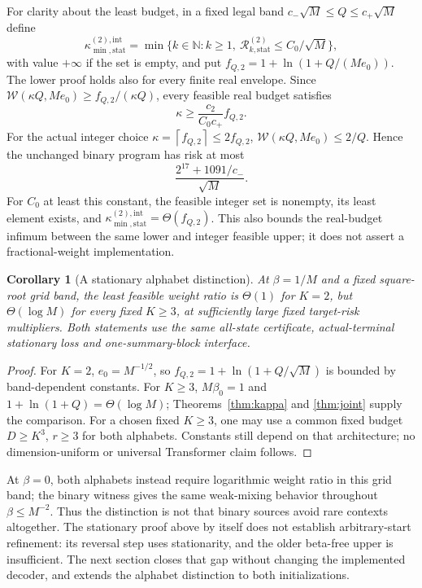 \documentclass[11pt,letterpaper]{article}
\newtheorem{corollary}[theorem]{Corollary}
\theoremstyle{definition}\newtheorem{definition}[theorem]{Definition}
\theoremstyle{remark}\newtheorem{remark}[theorem]{Remark}
\newcommand{\ceil}[1]{\left\lceil #1\right\rceil}
\newcommand{\betaz}{\beta_0}
\newcommand{\Risk}{\mathcal{R}}
\begin{document}
For clarity about the least budget, in a fixed legal band
$c_-\sqrt M\le Q\le c_+\sqrt M$ define
\[
 \kappa_{\min,\mathrm{stat}}^{(2),\mathrm{int}}
 =\min\{k\in\mathbb N:k\ge1,\
       \Risk_{k,\mathrm{stat}}^{(2)}\le C_0/\sqrt M\},
\]
with value $+\infty$ if the set is empty, and put
$f_{Q,2}=1+\ln(1+Q/(Me_0))$.
The lower proof holds also for every finite real envelope. Since
$\mathcal W(\kappa Q,Me_0)\ge f_{Q,2}/(\kappa Q)$, every feasible real budget satisfies
\[
 \kappa\ge\frac{c_2}{C_0c_+}f_{Q,2}.
\]
For the actual integer choice $\kappa=\ceil{f_{Q,2}}\le2f_{Q,2}$,
$\mathcal W(\kappa Q,Me_0)\le2/Q$. Hence the unchanged binary program has risk at most
\[
 \frac{2^{17}+1091/c_-}{\sqrt M}.
\]
For $C_0$ at least this constant, the feasible integer set is nonempty, its least element exists, and
$\kappa_{\min,\mathrm{stat}}^{(2),\mathrm{int}}=\Theta(f_{Q,2})$.
This also bounds the real-budget infimum between the same lower and integer feasible upper; it does not assert a fractional-weight implementation.

\begin{corollary}[A stationary alphabet distinction]\label{cor:alphabet}
At $\beta=1/M$ and a fixed square-root grid band, the least feasible weight ratio is $\Theta(1)$ for $K=2$, but $\Theta(\log M)$ for every fixed $K\ge3$, at sufficiently large fixed target-risk multipliers. Both statements use the same all-state certificate, actual-terminal stationary loss and one-summary-block interface.
\end{corollary}
\begin{proof}
For $K=2$, $e_0=M^{-1/2}$, so $f_{Q,2}=1+\ln(1+Q/\sqrt M)$ is bounded by band-dependent constants. For $K\ge3$, $M\betaz=1$ and $1+\ln(1+Q)=\Theta(\log M)$; Theorems~\ref{thm:kappa} and \ref{thm:joint} supply the comparison. For a chosen fixed $K\ge3$, one may use a common fixed budget $D\ge K^3$, $r\ge3$ for both alphabets. Constants still depend on that architecture; no dimension-uniform or universal Transformer claim follows.
\end{proof}

At $\beta=0$, both alphabets instead require logarithmic weight ratio in this grid band; the binary witness gives the same weak-mixing behavior throughout $\beta\le M^{-2}$. Thus the distinction is not that binary sources avoid rare contexts altogether. The stationary proof above by itself does not establish arbitrary-start refinement: its reversal step uses stationarity, and the older beta-free upper is insufficient. The next section closes that gap without changing the implemented decoder, and extends the alphabet distinction to both initializations.
\end{document}
